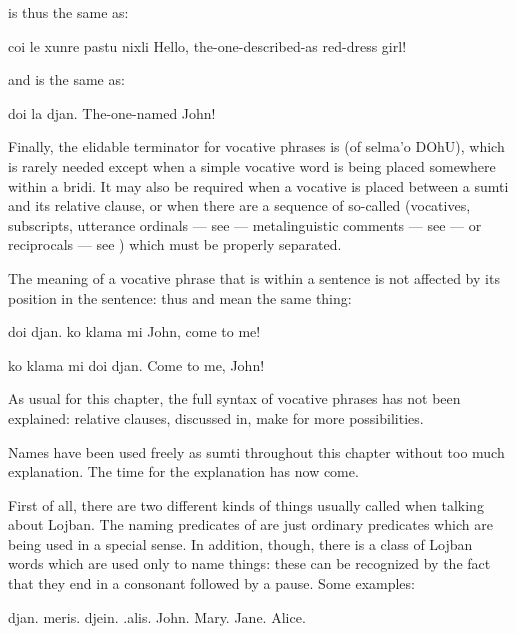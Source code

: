  is thus the same as:
\begin{example}
coi le xunre pastu nixli\n
Hello, the-one-described-as red-dress girl!
\end{example}

{\noindent}and  is the same as:
\begin{example}
doi la djan.\n
The-one-named John!
\end{example}

Finally, the elidable terminator for vocative phrases is
     (of selma'o DOhU), which is rarely needed except when
    a simple vocative word is being placed somewhere within a
    bridi. It may also be required when a vocative is placed
    between a sumti and its relative clause, or when there are a
    sequence of so-called  (vocatives,
    subscripts, utterance ordinals --- see  --- metalinguistic comments
    --- see  --- or reciprocals
    --- see ) which must be
    properly separated. 

The meaning of a vocative phrase that is within a sentence
    is not affected by its position in the sentence: thus  and  mean the same thing:
\begin{example}
doi djan. ko klama mi\n
John, come to me!
\end{example}

\begin{example}
ko klama mi doi djan.\n
Come to me, John!
\end{example}

As usual for this chapter, the full syntax of vocative
    phrases has not been explained: relative clauses, discussed in, make for more
    possibilities.



Names have been used freely as sumti throughout this chapter
    without too much explanation. The time for the explanation has
    now come.

First of all, there are two different kinds of things
    usually called  when talking about Lojban. The naming
    predicates of  are just ordinary
    predicates which are being used in a special sense. In
    addition, though, there is a class of Lojban words which are
    used only to name things: these can be recognized by the fact
    that they end in a consonant followed by a pause. Some
    examples:
\begin{example}
djan. meris. djein. .alis.\n
John.  Mary.  Jane.  Alice.
\end{example}

